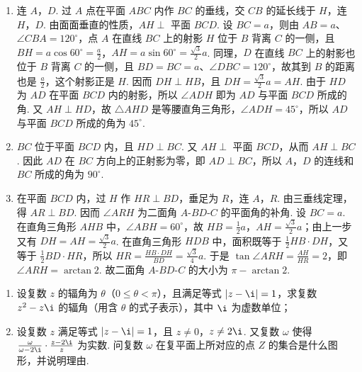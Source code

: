 \begin{solution}
\begin{enumerate}
\item 连 \(A\)，\(D\). 过 \(A\) 点在平面 \(ABC\) 内作 \(BC\) 的垂线，交 \(CB\) 的延长线于 \(H\)，连 \(H\)，\(D\). 由面面垂直的性质，\(AH \perp\) 平面 \(BCD\). 设 \(BC=a\)，则由 \(AB=a\)、\(\angle CBA=120^{\circ}\)，点 \(A\) 在直线 \(BC\) 上的射影 \(H\) 位于 \(B\) 背离 \(C\) 的一侧，且 \(BH=a\cos60^{\circ}=\frac a2\)，\(AH=a\sin60^{\circ}=\frac{\sqrt3}{2}a\). 同理，\(D\) 在直线 \(BC\) 上的射影也位于 \(B\) 背离 \(C\) 的一侧，且 \(BD=BC=a\)、\(\angle DBC=120^{\circ}\)，故其到 \(B\) 的距离也是 \(\frac a2\)，这个射影正是 \(H\). 因而 \(DH\perp HB\)，且 \(DH=\frac{\sqrt3}{2}a=AH\). 由于 \(HD\) 为 \(AD\) 在平面 \(BCD\) 内的射影，所以 \(\angle ADH\) 即为 \(AD\) 与平面 \(BCD\) 所成的角. 又 \(AH\perp HD\)，故 \(\triangle AHD\) 是等腰直角三角形，\(\angle ADH=45^{\circ}\)，所以 \(AD\) 与平面 \(BCD\) 所成的角为 \(45^{\circ}\).
\item \(BC\) 位于平面 \(BCD\) 内，且 \(HD\perp BC\). 又 \(AH\perp\) 平面 \(BCD\)，从而 \(AH\perp BC\). 因此 \(AD\) 在 \(BC\) 方向上的正射影为零，即 \(AD\perp BC\)，所以 \(A\)，\(D\) 的连线和 \(BC\) 所成的角为 \(90^{\circ}\).
\item 在平面 \(BCD\) 内，过 \(H\) 作 \(HR\perp BD\)，垂足为 \(R\)，连 \(A\)，\(R\). 由三垂线定理，得 \(AR\perp BD\). 因而 \(\angle ARH\) 为二面角 \(A\text{-}BD\text{-}C\) 的平面角的补角. 设 \(BC=a\). 在直角三角形 \(AHB\) 中，\(\angle ABH=60^{\circ}\)，故 \(HB=\frac12a\)，\(AH=\frac{\sqrt3}{2}a\)；由上一步又有 \(DH=AH=\frac{\sqrt3}{2}a\). 在直角三角形 \(HDB\) 中，面积既等于 \(\frac12HB\cdot DH\)，又等于 \(\frac12BD\cdot HR\)，所以
\(HR=\frac{HB\cdot DH}{BD}=\frac{\sqrt3}{4}a\). 于是 \(\tan\angle ARH=\frac{AH}{HR}=2\)，即 \(\angle ARH=\arctan2\). 故二面角 \(A\text{-}BD\text{-}C\) 的大小为 \(\pi-\arctan2\).
\end{enumerate}
\end{solution}

\begin{problem}
\begin{enumerate}
\item 设复数 \(z\) 的辐角为 \(\theta\)（\(0 \leqslant \theta < \pi\)），且满足等式 \(|z - \i| = 1\)，求复数 \(z^2 - z\i\) 的辐角（用含 \(\theta\) 的式子表示），其中 \(\i\) 为虚数单位；
\item 设复数 \(z\) 满足等式 \(|z - \i| = 1\)，且 \(z \neq 0\)，\(z \neq 2\i\). 又复数 \(\omega\) 使得 \(\frac{\omega}{\omega - 2\i} \cdot \frac{z - 2\i}{z}\) 为实数. 问复数 \(\omega\) 在复平面上所对应的点 \(Z\) 的集合是什么图形，并说明理由.
\end{enumerate}
\end{problem}

